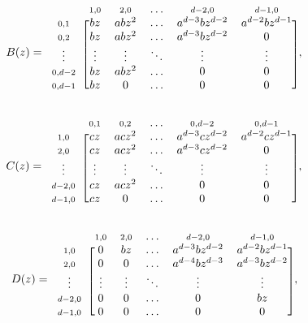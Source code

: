 \documentclass{article}
\begin{document}
\begin{equation*}
B(z) = 
\begin{blockarray}{cccccc}
   & \scriptstyle{1,0} & \scriptstyle{2,0} & \ldots &
    \scriptstyle{d-2,0} & \scriptstyle{d-1,0} \\
\begin{block}{c[ccccc]}
\scriptstyle{0,1} & bz & abz^2 & \ldots &
    a^{d-3}bz^{d-2} & a^{d-2}bz^{d-1} \\
\scriptstyle{0,2} & bz & abz^2 & \ldots & a^{d-3}bz^{d-2} & 0 \\
\vdots & \vdots & \vdots & \ddots & \vdots & \vdots \\
\scriptstyle{0,d-2} & bz & abz^2 & \ldots & 0 & 0 \\
\scriptstyle{0,d-1} & bz & 0 & \ldots & 0 & 0 \\
\end{block}
\end{blockarray},
\end{equation*}

\begin{equation*}
C(z) = 
\begin{blockarray}{cccccc}
   & \scriptstyle{0,1} & \scriptstyle{0,2} & \ldots &
    \scriptstyle{0,d-2} & \scriptstyle{0,d-1} \\
\begin{block}{c[ccccc]}
\scriptstyle{1,0} & cz & acz^2 & \ldots &
    a^{d-3}cz^{d-2} & a^{d-2}cz^{d-1} \\
\scriptstyle{2,0} & cz & acz^2 & \ldots & a^{d-3}cz^{d-2} & 0 \\
\vdots & \vdots & \vdots & \ddots & \vdots & \vdots \\
\scriptstyle{d-2,0} & cz & acz^2 & \ldots & 0 & 0 \\
\scriptstyle{d-1,0} & cz & 0 & \ldots & 0 & 0 \\
\end{block}
\end{blockarray},
\end{equation*}

\begin{equation*}
D(z) = 
\begin{blockarray}{cccccc}
   & \scriptstyle{1,0} & \scriptstyle{2,0} & \ldots &
    \scriptstyle{d-2,0} & \scriptstyle{d-1,0} \\
\begin{block}{c[ccccc]}
\scriptstyle{1,0} & 0 & bz & \ldots &
    a^{d-3}bz^{d-2} & a^{d-2}bz^{d-1} \\
\scriptstyle{2,0} & 0 & 0 & \ldots &
    a^{d-4}bz^{d-3} & a^{d-3}bz^{d-2} \\
\vdots & \vdots & \vdots & \ddots & \vdots & \vdots \\
\scriptstyle{d-2,0} & 0 & 0 & \ldots & 0 & bz \\
\scriptstyle{d-1,0} & 0 & 0 & \ldots & 0 & 0 \\
\end{block}
\end{blockarray},
\end{equation*}
\end{document}
